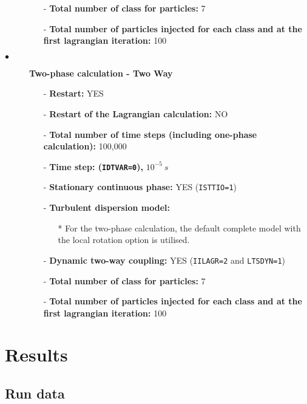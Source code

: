 \begin{description}
\begin{itemize}
            \item[-] {\bf Total number of class for particles:} 7
            \item[-] {\bf Total number of particles injected for each class and at the first lagrangian iteration:} 100
         \end{itemize}

   \item[$\bullet$]\textbf{Two-phase calculation - Two Way}
         \begin{itemize}
            \item[-] {\bf Restart:} YES
            \item[-] {\bf Restart of the Lagrangian calculation:} NO
            \item[-] {\bf Total number of time steps (including one-phase calculation):} 100,000
            \item[-] {\bf Time step: (\texttt{IDTVAR=0}),} $10^{-5}~s$
            \item[-] \textbf{Stationary continuous phase:} YES (\texttt{ISTTIO=1})

            \item[-] {\bf Turbulent dispersion model:}
                  \begin{itemize}
                     \item[*] For the two-phase calculation, the default complete model with the local rotation option is utilised.

                  \end{itemize}
            \item[-] {\bf Dynamic two-way coupling:} YES (\texttt{IILAGR=2} and \texttt{LTSDYN=1})

            \item[-] {\bf Total number of class for particles:} 7
            \item[-] {\bf Total number of particles injected for each class and at the first lagrangian iteration:} 100
         \end{itemize}

\end{description}

\section{Results}

\subsection{Run data}

